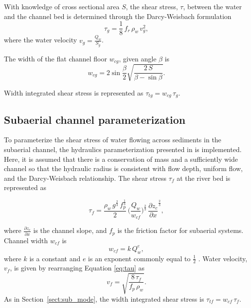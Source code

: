 \documentclass[11pt]{article}
\begin{document}
With knowledge of cross sectional area $S$, the shear stress, $\tau$, between the water and the channel bed is determined through the Darcy-Weisbach formulation
\begin{equation}
  \label{eq:tau}
  \tau_g=\frac{1}{8}\,f_r\,\rho_w\,v_g^2,
\end{equation}
% 
where  the water velocity $v_g = \frac{Q_w}{S_g}$.

The width of the flat channel floor $w_{cg}$, given angle $\beta$ is 
\begin{equation}
  \label{eq:dh2wc}
  w_{cg} = 2  \sin \frac{\beta}{2} \sqrt{\frac{2\, S}{\beta -\sin \beta}}.
\end{equation}

Width integrated shear stress is represented as $\tau_{tg}=w_{cg}\,\tau_g $.

\subsection{Subaerial channel  parameterization}
\label{sect:fluv}

To parameterize the shear stress of water flowing across sediments in the subaerial channel,  the hydraulics parameterization presented in \citet{tucker1997} is implemented.
Here, it is assumed that there is a conservation of mass and a sufficiently wide channel so that the hydraulic radius is consistent with flow depth, uniform flow, and the Darcy-Weisbach relationship.
The shear stress $\tau_f$ at the river bed is represented as
\begin{linenomath*}
  \begin{equation}
    \label{eq:DW_tau}
    \tau_f=\frac{\rho_w\,g^{\frac{2}{3}}\,f_p^{\frac{1}{3}}}{2}\, \Big(\frac{Q_w}{w_{cf}} \Big)^{\frac{2}{3}} \,\frac{\partial z_c}{\partial x}^{\frac{2}{3}},
  \end{equation}
\end{linenomath*}
where $\frac{\partial z_c}{\partial x}$ is the channel slope, and $f_p$ is the friction factor for subaerial systems.
Channel width $w_{cf}$ is 
\begin{equation}
  \label{eq:wcf}
  w_{cf} = k \, Q_w^e,
\end{equation}
% 
where $k$ is a constant and $e$ is an exponent commonly equal to $\frac{1}{2}$ \citep{leopold1953}.
Water velocity, $v_f$, is given by rearranging Equation \ref{eq:tau} as
\begin{equation}
  \label{eq:vf}
  v_f = \sqrt{\frac{8\,\tau_f}{f_p\,\rho_w}}.
\end{equation}
% 
As in Section~\ref{sect:sub_mode}, the width integrated shear stress is $\tau_{tf}=w_{cf}\,\tau_f$.
\end{document}
